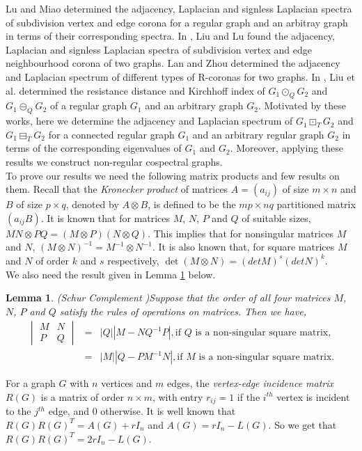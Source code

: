 \documentclass[a4paper,12pt]{article}
\newtheorem{lemma}{Lemma}[section]
\begin{document}
Lu and Miao \cite{Lu} determined the adjacency, Laplacian and signless Laplacian spectra of subdivision vertex and edge corona for a regular graph and an arbitray graph in terms of their corresponding spectra. In \cite{Liu}, Liu and Lu found the adjacency, Laplacian and signless Laplacian spectra of subdivision vertex and edge neighbourhood corona of two graphs. Lan and Zhou \cite{Lan} determined the adjacency and Laplacian spectrum of different types of R-coronas for two graphs.
In \cite{Liu2}, Liu et al. determined the resistance distance and Kirchhoff index of $G_{1}\odot_{Q} G_{2}$ and $G_{1}\circleddash_{Q} G_{2}$ of a regular graph $G_{1}$ and an arbitrary graph $G_{2}$. Motivated by these works, here we determine the adjacency and Laplacian spectrum of $G_{1}\boxdot_{T} G_{2}$ and $G_{1}\boxminus_{T} G_{2}$ for a connected regular graph $G_{1}$ and an arbitrary regular graph $G_{2}$ in terms of the corresponding eigenvalues of $G_{1}$ and $G_{2}$. Moreover, applying these results we construct non-regular cospectral graphs.\\
To prove our results we need the following matrix products and few results on them. Recall that the \textit{Kronecker product} of matrices $A=(a_{ij})$ of size $m\times n$ and $B$ of size $p\times q$, denoted by $A\otimes B$, is defined to be the $mp\times nq$ partitioned matrix $(a_{ij}B)$. It is known \cite{Hor} that for matrices $M$, $N$, $P$ and $Q$ of suitable sizes, $MN\otimes PQ=(M\otimes P)(N\otimes Q)$. This implies that for nonsingular matrices $M$ and $N$, $(M\otimes N)^{-1}=M^{-1}\otimes N^{-1}$. It is also known \cite{Hor} that, for square matrices $M$ and $N$ of order $k$ and $s$ respectively, $\det(M\otimes N)=(detM)^{s}(detN)^{k}$.\\
We also need the result given in Lemma \ref{schur} below.
\begin{lemma}(Schur Complement \cite{Cve})\label{schur} Suppose that the order of all four matrices $M$, $N$, $P$ and $Q$ satisfy the rules of operations on matrices. Then we have,
\begin{eqnarray*}
\begin{vmatrix}
  M & N \\
  P & Q
  \end{vmatrix}
&=& |Q||M-NQ^{-1}P|, \mbox{if $Q$ is a non-singular square matrix},\\
&=& |M||Q-PM^{-1}N|, \mbox{if $M$ is a non-singular square matrix}.
\end{eqnarray*}
\end{lemma}
For a graph $G$ with $n$ vertices and $m$ edges, the \emph{vertex-edge incidence matrix} $R(G)$ \cite{God} is a matrix of order $n\times m$, with entry $r_{ij}=1$ if the $i^{th}$ vertex is incident to the $j^{th}$ edge, and $0$ otherwise. It is well known \cite{Cve} that $R(G)R(G)^{T}=A(G)+rI_{n}$ and $A(G)=rI_{n}-L(G)$. So we get that $R(G)R(G)^{T}=2rI_{n}-L(G)$.\\
\end{document}
